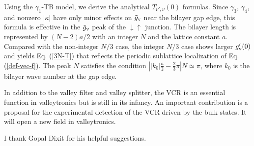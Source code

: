 \documentclass{jpsj3}
\begin{document}
Using the $\gamma_1$-TB model,
we derive the analytical $T_{\nu',\nu}(0)$
formulas.
Since $\gamma_3$, $\gamma_4$, and nonzero $|\kappa|$
have only minor effects on  $\tilde{g}_{\rm v}$ near the bilayer gap edge,
this formula is effective in the $\tilde{g}_{\rm v}$ peak
of the $\downarrow\uparrow$ junction.
The bilayer length is represented by $(N-2)a/2$ with an integer $N$ and the lattice constant $a$.
Compared with the non-integer $N/3$ case,
the integer $N/3$ case 
shows larger $g'_{\rm v}(0)$ 
and yields Eq. (\ref{3N-T})
that reflects the periodic sublattice localization of Eq. (\ref{def-vec-f}).
The peak $N$ satisfies the condition $\left||k_0|\frac{a}{2}-\frac{2}{3}\pi\right| N \simeq \pi$, where $k_0$ is the bilayer wave number
at the gap edge.



In addition to the valley filter and valley splitter,
the VCR is an essential function in valleytronics but is still in its infancy.
An important contribution is a proposal for the experimental detection
of the VCR driven by the bulk states.
It will open a new field in valleytronics.



\acknowledgments

I thank Gopal Dixit for his helpful suggestions.

\newpage








\appendix
\end{document}
